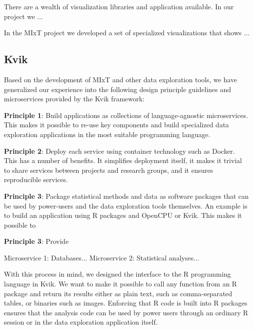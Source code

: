 There are a wealth of visualization libraries and application available. In our
project we ... 

In the MIxT project we developed a set of specialized visualizations that
shows ... 


\subsection*{Kvik}


Based on the development of MIxT and other data exploration tools, we have
generalized our experience into the following design principle guidelines and
microservices provided by the Kvik framework:

\textbf{Principle 1}: Build applications as collections of language-agnostic
microservices. This makes it possible to re-use key components and build
specialized data exploration applications in the most suitable programming
language. 

\textbf{Principle 2}: Deploy each service using container technology such as
Docker. This has a number of benefits. It simplifies deployment itself, it makes
it trivial to share services between projects and research groups, and it
ensures reproducible services.

\textbf{Principle 3}: Package statistical methods and data as software packages
that can be used by power-users and the data exploration tools themselves. An
example is to build an application using R packages and OpenCPU or Kvik. This
makes it possible to 

\textbf{Principle 3}: Provide 



Microservice 1: Databases...
Microservice 2: Statistical analyses...


With this process in mind, we designed the interface to the R programming
language in Kvik. We want to make it possible to call any function from an R
package and return its results either as plain text, such as comma-separated
tables, or binaries such as images. Enforcing that R code is built into R
packages ensures that the analysis code can be used by power users through an
ordinary R session or in the data exploration application itself. 


